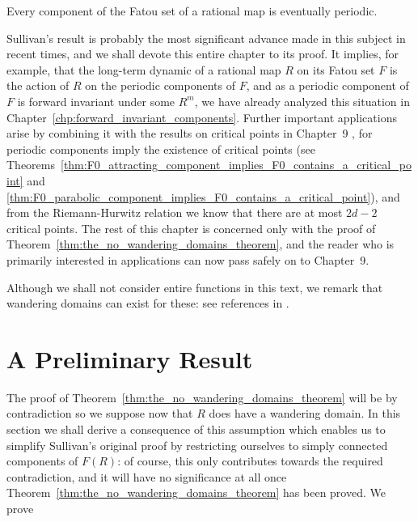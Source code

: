 \begin{theorem}
    \label{thm:the_no_wandering_domains_theorem}
    Every component of the Fatou set of a rational map is eventually periodic.
\end{theorem}

Sullivan's result is probably the most significant advance made in this subject
in recent times, and we shall devote this entire chapter to its proof. It
implies, for example, that the long-term dynamic of a rational map $R$ on its
Fatou set $F$ is the action of $R$ on the periodic components of $F$, and as a
periodic component of $F$ is forward invariant under some $R^m$, we have already
analyzed this situation in Chapter~\ref{chp:forward_invariant_components}.
Further important applications arise by combining it with the results on
critical points in Chapter~9 \cite{Beardon1991}, for periodic components imply
the existence of critical points (see
Theorems~\ref{thm:F0_attracting_component_implies_F0_contains_a_critical_point}
and \ref{thm:F0_parabolic_component_implies_F0_contains_a_critical_point}), and
from the Riemann-Hurwitz relation we know that there are at most $2d - 2$
critical points. The rest of this chapter is concerned only with the proof of
Theorem~\ref{thm:the_no_wandering_domains_theorem}, and the reader who is
primarily interested in applications can now pass safely on to Chapter~9.

Although we shall not consider entire functions in this text, we remark that
wandering domains can exist for these: see references in
\cite[177]{Beardon1991}.

\section{A Preliminary Result}
\label{sec:a_preliminary_result}

The proof of Theorem~\ref{thm:the_no_wandering_domains_theorem} will be by
contradiction so we suppose now that $R$ does have a wandering domain. In this
section we shall derive a consequence of this assumption which enables us to
simplify Sullivan's original proof by restricting ourselves to simply connected
components of $F(R)$: of course, this only contributes towards the required
contradiction, and it will have no significance at all once
Theorem~\ref{thm:the_no_wandering_domains_theorem} has been proved. We prove

